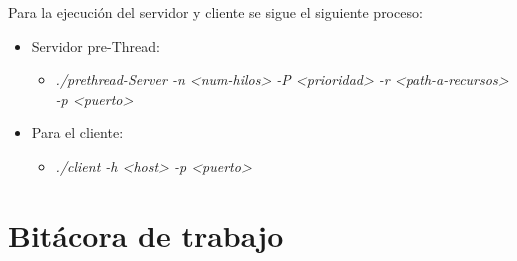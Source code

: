 \documentclass{article}
\let\<\textless
\let\>\textgreater
\begin{document}
Para la ejecuci\'on del servidor y cliente se sigue el siguiente proceso:
\begin{itemize}
  \item Servidor pre-Thread:
  \begin{itemize}
    \item \emph{./prethread-Server -n \<num-hilos\> -P \<prioridad\> -r \<path-a-recursos\> -p \<puerto\>}
  \end{itemize}
  \item Para el cliente:
  \begin{itemize}
    \item \emph{./client -h \<host\> -p \<puerto\>}
  \end{itemize}
\end{itemize}

\section{Bit\'acora de trabajo}
\end{document}
